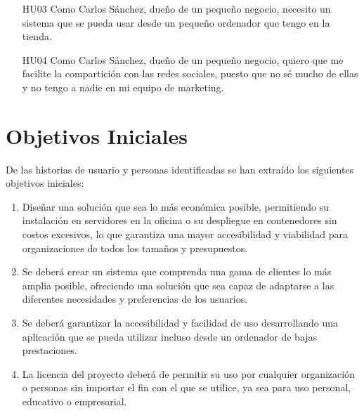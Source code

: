         \begin{enumerate}
            \item [HU03] Como Carlos Sánchez, dueño de un pequeño negocio, necesito un sistema que se pueda usar desde un pequeño ordenador que tengo en la tienda.
            \item [HU04] Como Carlos Sánchez, dueño de un pequeño negocio, quiero que me facilite la compartición con las redes sociales, puesto que no sé mucho de ellas y no tengo a nadie en mi equipo de marketing.
        \end{enumerate}

\section{Objetivos Iniciales}

De las historias de usuario y personas identificadas se han extraído los siguientes objetivos iniciales:

\begin{enumerate}
    \item Diseñar una solución que sea lo más económica posible, permitiendo su instalación en servidores en la oficina o su despliegue en contenedores sin costos excesivos, lo que garantiza una mayor accesibilidad y viabilidad para organizaciones de todos los tamaños y presupuestos.
    \item Se deberá crear un sistema que comprenda una gama de clientes lo más amplia posible, ofreciendo una solución que sea capaz de adaptarse a las diferentes necesidades y preferencias de los usuarios.
    \item Se deberá garantizar la accesibilidad y facilidad de uso desarrollando una aplicación que se pueda utilizar incluso desde un ordenador de bajas prestaciones.
    \item La licencia del proyecto deberá de permitir su uso por cualquier organización o personas sin importar el fin con el que se utilice, ya sea para uso personal, educativo o empresarial.
\end{enumerate}